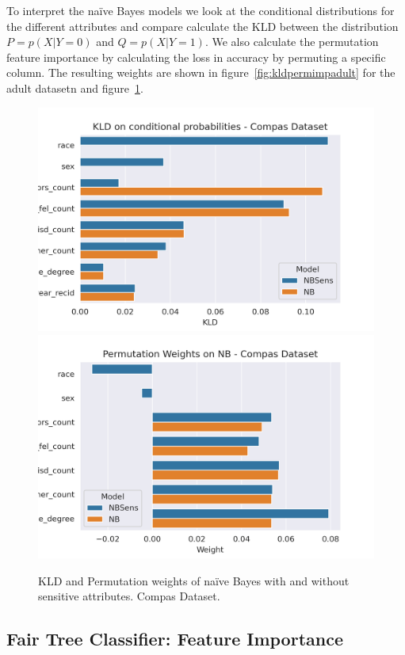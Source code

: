 To interpret the naïve Bayes models we look at the conditional distributions for the different attributes and compare calculate the KLD between the distribution $P = p(X|Y=0)$ and $Q = p(X|Y=1)$. We also calculate the permutation feature importance by calculating the loss in accuracy by permuting a specific column. The resulting weights are shown in figure~\ref{fig:kldpermimpadult} for the adult datasetn and figure~\ref{fig:kldpermimpcompas}.

\begin{figure}
    \centering
    \includegraphics[width=0.49\linewidth]{figures/KLDimportance-compas.png}
    \includegraphics[width=0.49\linewidth]{figures/permimportance-compas.png}
    \caption{KLD and Permutation weights of naïve Bayes with and without sensitive attributes. Compas Dataset.}
    \label{fig:kldpermimpcompas}
\end{figure}

\subsection{Fair Tree Classifier: Feature Importance}

